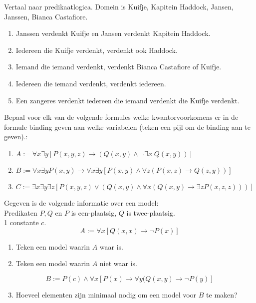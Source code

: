 \begin{answer}
Vertaal naar predikaatlogica. Domein is Kuifje, Kapitein Haddock, Jansen, Janssen, Bianca Castafiore.
\begin{enumerate}[label=\textit{\alph*.}]
    \item Janssen verdenkt Kuifje en Jansen verdenkt Kapitein Haddock.
    \item Iedereen die Kuifje verdenkt, verdenkt ook Haddock.
    \item Iemand die iemand verdenkt, verdenkt Bianca Castafiore of Kuifje.
    \item Iedereen die iemand verdenkt, verdenkt iedereen.
    \item Een zangeres verdenkt iedereen die iemand verdenkt die Kuifje verdenkt.
\end{enumerate}
\end{answer}

\begin{answer}
Bepaal voor elk van de volgende formules welke kwantorvoorkomens er in de formule binding geven aan welke variabelen (teken een pijl om de binding aan te geven).:
\begin{enumerate}
    \item $A:=\forall x\exists y[P(x,y,z)\rightarrow(Q(x,y)\wedge\neg\exists x\;Q(x,y))]$\\
    \item $B:=\forall x\exists y P(x,y)\rightarrow \forall x\exists y[P(x,y)\wedge \forall z(P(x,z)\rightarrow Q(z,y))]$\\
    \item $C:= \exists x\exists y\exists z[P(x,y,z)\vee(Q(x,y)\wedge\forall x(Q(x,y)\rightarrow\exists z P(x,z,z)))]$
\end{enumerate}
\end{answer}

\begin{answer}
Gegeven is de volgende informatie over een model:\\
Predikaten $P,Q$ en $P$ is een-plaatsig, $Q$ is twee-plaatsig.\\
1 constante $c$.
$$A:=\forall x[Q(x,x)\rightarrow\neg P(x)]$$
\begin{enumerate}[label=\textit{\alph*.}]
\item Teken een model waarin $A$ waar is.
\item Teken een model waarin $A$ niet waar is.
\end{enumerate}
$$B:=P(c)\wedge\forall x[P(x)\rightarrow\forall y(Q(x,y)\rightarrow\neg P(y)]$$
\begin{enumerate}[label=\textit{\alph*.}]
\setcounter{enumi}{2}
\item Hoeveel elementen zijn minimaal nodig om een model voor $B$ te maken?
\end{enumerate}
\end{answer}


